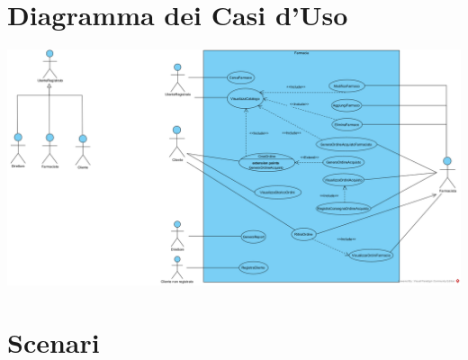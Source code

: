 \section{Diagramma dei Casi d'Uso}

\includegraphics[width=\linewidth]{assets/UseCaseFarmacia.png}

\pagebreak

\section{Scenari}


















